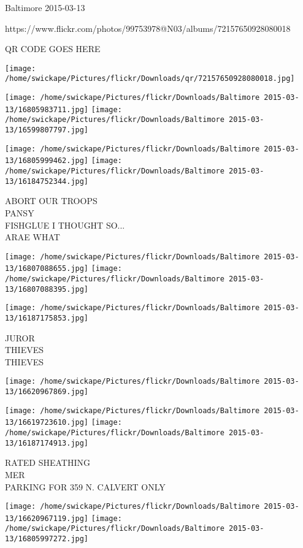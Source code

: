 \documentclass[10pt,letterpaper]{article}
\begin{document}
Baltimore 2015-03-13

https://www.flickr.com/photos/99753978@N03/albums/72157650928080018

QR CODE GOES HERE

\texttt{[image: /home/swickape/Pictures/flickr/Downloads/qr/72157650928080018.jpg]}
\pagebreak

\texttt{[image: /home/swickape/Pictures/flickr/Downloads/Baltimore 2015-03-13/16805983711.jpg]}
\texttt{[image: /home/swickape/Pictures/flickr/Downloads/Baltimore 2015-03-13/16599807797.jpg]}

\texttt{[image: /home/swickape/Pictures/flickr/Downloads/Baltimore 2015-03-13/16805999462.jpg]}
\texttt{[image: /home/swickape/Pictures/flickr/Downloads/Baltimore 2015-03-13/16184752344.jpg]}

ABORT OUR TROOPS\\
PANSY\\
FISHGLUE I THOUGHT SO...\\
ARAE WHAT\\
\pagebreak

\texttt{[image: /home/swickape/Pictures/flickr/Downloads/Baltimore 2015-03-13/16807088655.jpg]}
\texttt{[image: /home/swickape/Pictures/flickr/Downloads/Baltimore 2015-03-13/16807088395.jpg]}

\texttt{[image: /home/swickape/Pictures/flickr/Downloads/Baltimore 2015-03-13/16187175853.jpg]}

JUROR\\
THIEVES\\
THIEVES\\
\pagebreak

\texttt{[image: /home/swickape/Pictures/flickr/Downloads/Baltimore 2015-03-13/16620967869.jpg]}

\vspace{0.25in}
\texttt{[image: /home/swickape/Pictures/flickr/Downloads/Baltimore 2015-03-13/16619723610.jpg]}
\texttt{[image: /home/swickape/Pictures/flickr/Downloads/Baltimore 2015-03-13/16187174913.jpg]}

RATED SHEATHING\\
MER\\
PARKING FOR 359 N. CALVERT ONLY\\
\pagebreak

\texttt{[image: /home/swickape/Pictures/flickr/Downloads/Baltimore 2015-03-13/16620967119.jpg]}
\texttt{[image: /home/swickape/Pictures/flickr/Downloads/Baltimore 2015-03-13/16805997272.jpg]}
\end{document}
